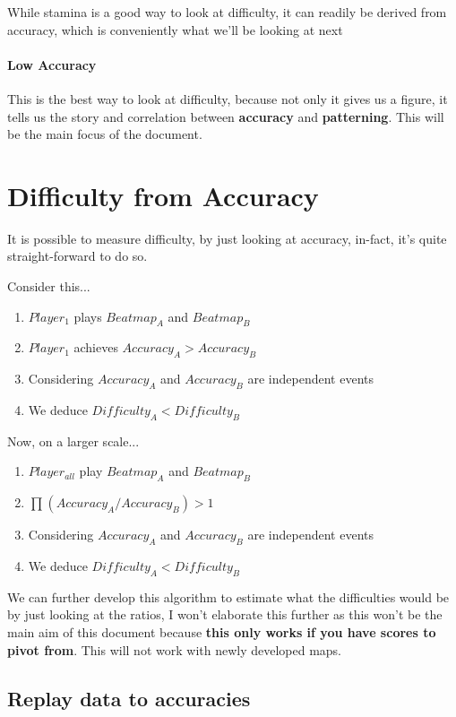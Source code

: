 \documentclass{article}
\begin{document}
While stamina is a good way to look at difficulty, it can readily be derived from accuracy, which is conveniently what we'll be looking at next

\paragraph{Low Accuracy}

This is the best way to look at difficulty, because not only it gives us a figure, it tells us the story and correlation between \textbf{accuracy} and \textbf{patterning}. This will be the main focus of the document.

\section{Difficulty from Accuracy}

It is possible to measure difficulty, by just looking at accuracy, in-fact, it's quite straight-forward to do so.

Consider this...
\begin{enumerate}
	\item $Player_1$ plays $Beatmap_A$ and $Beatmap_B$
	\item $Player_1$ achieves $Accuracy_A > Accuracy_B$
	\item Considering $Accuracy_A$ and $Accuracy_B$ are independent events
	\item We deduce $Difficulty_A < Difficulty_B$
\end{enumerate}

Now, on a larger scale...
\begin{enumerate}
	\item $Player_{all}$ play $Beatmap_A$ and $Beatmap_B$
	\item $\prod_{} (Accuracy_A / Accuracy_B) > 1$
	\item Considering $Accuracy_A$ and $Accuracy_B$ are independent events
	\item We deduce $Difficulty_A < Difficulty_B$
\end{enumerate}

We can further develop this algorithm to estimate what the difficulties would be by just looking at the ratios, I won't elaborate this further as this won't be the main aim of this document because \textbf{this only works if you have scores to pivot from}. This will not work with newly developed maps.

\subsection{Replay data to accuracies}
\end{document}
